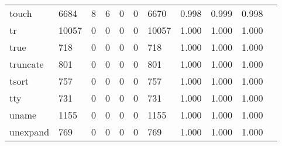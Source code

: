 \begin{longtable}{lp{1.10cm}p{1.10cm}p{1.10cm}p{1.10cm}p{1.10cm}p{1.10cm}p{1.10cm}p{1.10cm}p{1.10cm}p{1.10cm}}
touch     &                   6684 &                                  8 &                                 6 &                                0 &                                 0 &                            6670 &                          0.998 &                                 0.999 &                               0.998 \\
tr        &                  10057 &                                  0 &                                 0 &                                0 &                                 0 &                           10057 &                          1.000 &                                 1.000 &                               1.000 \\
true      &                    718 &                                  0 &                                 0 &                                0 &                                 0 &                             718 &                          1.000 &                                 1.000 &                               1.000 \\
truncate  &                    801 &                                  0 &                                 0 &                                0 &                                 0 &                             801 &                          1.000 &                                 1.000 &                               1.000 \\
tsort     &                    757 &                                  0 &                                 0 &                                0 &                                 0 &                             757 &                          1.000 &                                 1.000 &                               1.000 \\
tty       &                    731 &                                  0 &                                 0 &                                0 &                                 0 &                             731 &                          1.000 &                                 1.000 &                               1.000 \\
uname     &                   1155 &                                  0 &                                 0 &                                0 &                                 0 &                            1155 &                          1.000 &                                 1.000 &                               1.000 \\
unexpand  &                    769 &                                  0 &                                 0 &                                0 &                                 0 &                             769 &                          1.000 &                                 1.000 &                               1.000 \\

\end{longtable}

